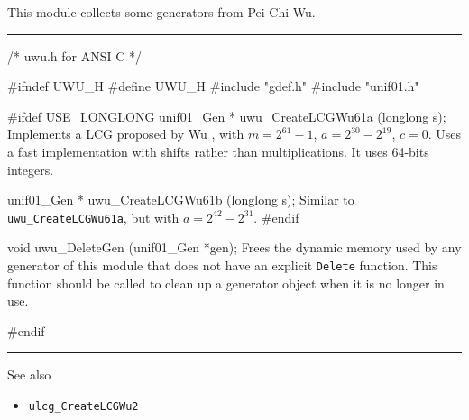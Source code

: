 
This module collects some generators from Pei-Chi Wu.


\bigskip
\hrule
\code\hide
/* uwu.h for ANSI C */

#ifndef UWU_H
#define UWU_H
\endhide
#include "gdef.h"
#include "unif01.h"


#ifdef USE_LONGLONG
   unif01_Gen * uwu_CreateLCGWu61a (longlong s);
\endcode
  \tab  Implements a LCG proposed by Wu \cite{rWU97a},
  with $m= 2^{61}-1$, $a = 2^{30} - 2^{19}$, $c=0$.
  Uses a fast implementation with shifts rather than
  multiplications.  
  It uses 64-bits integers. %
 \endtab
\code


   unif01_Gen * uwu_CreateLCGWu61b (longlong s);
\endcode
  \tab   Similar to {\tt uwu\_CreateLCGWu61a},
   but with  $a = 2^{42} - 2^{31}$. 
 \endtab
\code
#endif
\endcode




\code


void uwu_DeleteGen (unif01_Gen *gen);
\endcode
 \tab Frees the dynamic memory used by any generator of this module
  that does not have an explicit {\tt Delete} function. 
  This function should be called to clean up a generator object
  when it is no longer in use.
 \endtab
\code

\hide
#endif
\endhide
\endcode


\bigskip
\hrule
\bigskip

{
See also
\bigskip

\setlength{\partopsep}{0pt}
\setlength{\parskip}{0pt}
\setlength{\topsep}{0pt}
\setlength{\itemsep}{0pt}

\begin{itemize}
\item {\tt ulcg\_CreateLCGWu2}
\end{itemize}
}
